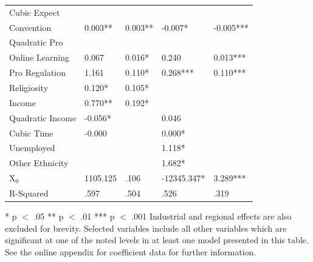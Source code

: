 \documentclass[AER]{./aea-latex-templates/AEA}
\begin{document}
\begin{table}
\begin{tabular}{lllll}
    Cubic Expect
    \\Convention & 0.003** & 0.003** & -0.007* & -0.005*** \\ %
    Quadratic Pro
    \\Online Learning & 0.067 & 0.016* & 0.240 & 0.013*** \\ %
    Pro Regulation & 1.161 & 0.110* & 0.268*** & 0.110*** \\ %
    Religiosity & 0.120* & 0.105* \\ %
    Income & 0.770** & 0.192* \\ %
    Quadratic Income & -0.056* &  & 0.046 &  \\ %
    Cubic Time & -0.000 &  & 0.000* &  \\ %
    Unemployed &  &  & 1.118* &  \\ %
    Other Ethnicity &  &  & 1.682* & \\ %
    X$_0$ & 1105.125 & .106 & -12345.347* & 3.289*** \\
    R-Squared & .597 & .504 & .526 & .319 %

    \end{tabular}
    \begin{tablenotes}
        * p $<$ .05
        ** p $<$ .01
        *** p $<$ .001
        Industrial and regional effects are also excluded for brevity.
        Selected variables include all other variables which are significant at one of the noted levels in at least one model presented in this table.
        See the online appendix for coefficient data for further information.
    \end{tablenotes}
    \label{tab:models}
    \end{table}
\end{document}
